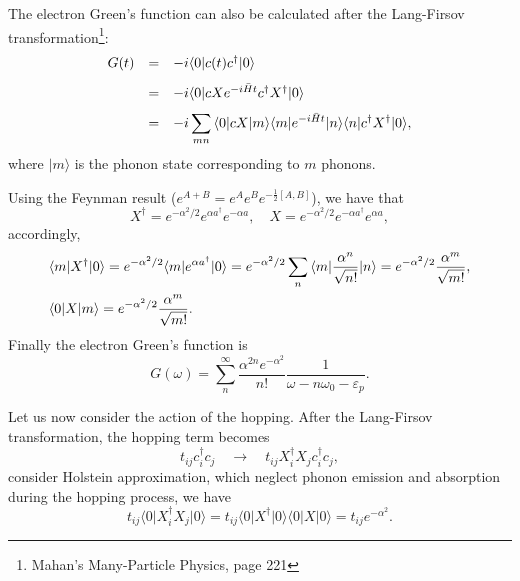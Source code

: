 \documentclass{book}
\newcommand{\bra}[1]{{\langle#1|}}
\newcommand{\ket}[1]{{|#1\rangle}}
\numberwithin{equation}{section}
\begin{document}
The electron Green's function can also be calculated after the
Lang-Firsov transformation\footnote{Mahan's Many-Particle Physics, page 221}:
\begin{equation}
  \begin{array}{rcl}
  G(t)&=&-i\bra{0}c(t)c^\dag\ket{0}\\\vbox to 18pt{}
  &=&-i\bra{0}cXe^{-i\bar{H}t}c^\dag X^\dag\ket{0}\\\vbox to 18pt{}
  &=&-i\displaystyle\sum_{mn}\bra{0}cX\ket{m}\bra{m}e^{-i\bar{H}t}\ket{n}\bra{n}
  c^\dag X^\dag\ket{0},\\
  \end{array}
\end{equation}
where $\ket{m}$ is the phonon state corresponding to $m$ phonons.

Using the Feynman result ($e^{A+B}=e^Ae^Be^{-\frac{1}{2}[A,B]}$), we have that
\begin{equation}
  X^\dag=e^{-\alpha^2/2}e^{\alpha a^\dag}e^{-\alpha a},\quad
  X=e^{-\alpha^2/2}e^{-\alpha a^\dag}e^{\alpha a},
\end{equation}
accordingly,
\begin{equation}
  \begin{array}{l}
  \displaystyle\bra{m}X^\dag\ket{0}=e^{-\alpha^2/2}\bra{m}e^{\alpha a^\dag}\ket{0}
  =e^{-\alpha^2/2}\sum_n\bra{m}\frac{\alpha^n}{\sqrt{n!}}\ket{n}
  =e^{-\alpha^2/2}\frac{\alpha^m}{\sqrt{m!}},\\\vbox to 18pt{}
  \displaystyle\bra{0}X\ket{m}=e^{-\alpha^2/2}\frac{\alpha^m}{\sqrt{m!}}.
  \end{array}
\end{equation}
Finally the electron Green's function is
\begin{equation}
  G(\omega)=\sum_{n}^\infty \frac{\alpha^{2n}e^{-\alpha^2}}{n!}
  \frac{1}{\omega-n\omega_0-\varepsilon_p}.
\end{equation}

Let us now consider the action of the hopping. After the Lang-Firsov
transformation, the hopping term becomes
\begin{equation}
  t_{ij}c_i^\dag c_j\quad\to\quad t_{ij}X_i^\dag X_jc_i^\dag c_j,
\end{equation}
consider Holstein approximation, which neglect phonon emission and
absorption during the hopping process, we have
\begin{equation}
  t_{ij}\bra{0}X_i^\dag X_j\ket{0}=t_{ij}\bra{0}X^\dag\ket{0}\bra{0}X\ket{0}
  =t_{ij}e^{-\alpha^2}.
\end{equation}
\end{document}
